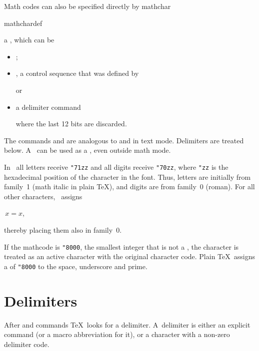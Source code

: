 Math codes can also be specified directly by 
\cstoidx mathchar\par\cstoidx mathchardef\par
a , which can be\label{math:character}
\begin{itemize}\item{}; 
\item {}, a control sequence that was defined by
\begin{disp}
\end{disp}
 or
\item a delimiter command\alt
\begin{disp}\end{disp}
 where the last 12 bits
are discarded.\end{itemize}
The commands  and 
are analogous to  and  in text mode.
Delimiters are treated below.
A~ 
can be used as a , even outside math mode.

In \IniTeX\ all letters receive  \verb-"71zz- and
all digits receive \verb-"70zz-, where \verb-"zz- is the 
hexadecimal position of the character in the font.
Thus, letters are initially from family~1
(math italic in plain \TeX), and digits are from family~0
(roman).
For all other characters, \IniTeX\ assigns
\begin{disp}$\,x=x$,\end{disp}
thereby placing them also in family~0.

If the mathcode is \verb-"8000-,
\label{mcode:8000}the smallest integer that is
not a , the character is treated as an active
character with the original character code. Plain \TeX\
assigns a  of \verb-"8000- to the space, underscore and prime.


\section{Delimiters}

After  and 
commands \TeX\ looks for a delimiter. A~delimiter
is either an explicit  command (or a
macro abbreviation for it), or a character with a non-zero
delimiter code.

